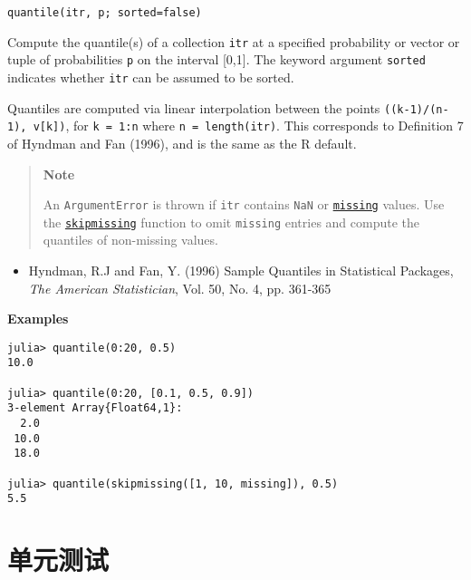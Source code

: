 \begin{adjustwidth}{2em}{0pt}


\begin{verbatim}
quantile(itr, p; sorted=false)
\end{verbatim}

Compute the quantile(s) of a collection \texttt{itr} at a specified probability or vector or tuple of probabilities \texttt{p} on the interval [0,1]. The keyword argument \texttt{sorted} indicates whether \texttt{itr} can be assumed to be sorted.

Quantiles are computed via linear interpolation between the points \texttt{((k-1)/(n-1), v[k])}, for \texttt{k = 1:n} where \texttt{n = length(itr)}. This corresponds to Definition 7 of Hyndman and Fan (1996), and is the same as the R default.

\begin{quote}
\textbf{Note}

An \texttt{ArgumentError} is thrown if \texttt{itr} contains \texttt{NaN} or \hyperlink{14596725676261444434}{\texttt{missing}} values. Use the \hyperlink{2012470681884771400}{\texttt{skipmissing}} function to omit \texttt{missing} entries and compute the quantiles of non-missing values.

\end{quote}
\begin{itemize}
\item Hyndman, R.J and Fan, Y. (1996) {\textquotedbl}Sample Quantiles in Statistical Packages{\textquotedbl}, \emph{The American Statistician}, Vol. 50, No. 4, pp. 361-365

\end{itemize}
\textbf{Examples}


\begin{verbatim}
julia> quantile(0:20, 0.5)
10.0

julia> quantile(0:20, [0.1, 0.5, 0.9])
3-element Array{Float64,1}:
  2.0
 10.0
 18.0

julia> quantile(skipmissing([1, 10, missing]), 0.5)
5.5
\end{verbatim}



\end{adjustwidth}



\hypertarget{17778253023886211260}{}


\chapter{单元测试}





